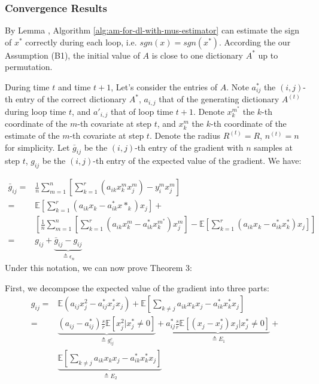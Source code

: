 \subsubsection{Convergence Results}

By Lemma \cite{chatterji2017alternating}, Algorithm  \ref{alg:am-for-dl-with-mus-estimator} can estimate the sign of $x^*$ correctly during each loop, i.e. $sgn(x)=sgn(x^*)$. According the our Assumption (B1), the initial value of $A$ is close to one dictionary $A^*$ up to permutation.

During time $t$ and time $t+1$, Let's consider the entries of $A$. Note $a^*_{ij}$ the $(i,j)$-th entry of the correct dictionary $A^*$, $a_{i,j}$ that of the generating dictionary $A^{(t)}$ during loop time $t$, and $a'_{i,j}$ that of loop time $t+1$. Denote $x^{m^*}_k$ the $k$-th coordinate of the $m$-th covariate at step $t$, and $x^m_k$ the $k$-th coordinate of the estimate of the $m$-th covariate at step $t$. Denote the radius $R^{(t)}=R$, $n^{(t)}=n$ for simplicity. Let $\bar g_{ij}$ be the $(i,j)$-th entry of the gradient with $n$ samples at step $t$, $g_{ij}$ be the $(i,j)$-th entry of the expected value of the gradient. We have:

\begin{equation}
\begin{aligned}
\bar g_{ij}=&\frac1n\sum_{m=1}^n\left[\sum_{k=1}^r(a_{ik}x_k^mx_j^m)-y_i^mx_j^m\right]\\
=&\mathbb E\left[\sum_{k=1}^r\left(a_{ik}x_k-a^*_{ik}x*_k\right)x_j\right]+\\
&\left[\frac1n\sum_{m=1}^n\left[\sum_{k=1}^r(a_{ik}x_k^m-a^*_{ik}x^{m^*}_k)x_j^m\right]-\mathbb E\left[\sum_{k=1}^r\left(a_{ik}x_k-a^*_{ik}x^*_{k}\right)x_j\right]\right]\\
=&g_{ij}+\underbrace{\bar g_{ij}-g_{ij}}_{\triangleq\epsilon_n}
\end{aligned}
\end{equation}
Under this notation, we can now prove Theorem 3:

First, we decompose the expected value of the gradient into three parts:
\begin{equation}
\begin{aligned}
g_{ij}=&\mathbb E \left(a_{ij}x_j^2-a_{ij}^*x_j^*x_j\right)+\mathbb E\left[\sum_{k\neq j}a_{ik}x_kx_j-a^*_{ik}x^*_kx_j\right]\\
=&\underbrace{(a_{ij}-a^*_{ij})\frac s r \mathbb E[x_j^2|x_j^*\neq 0]}_{\triangleq g_{ij}^c}+\underbrace{a^*_{ij}\frac s r\mathbb E [(x_j-x_j^*)x_j|x_j^*\neq0]}_{\triangleq E_1}+\\
&\underbrace{\mathbb E\left[\sum_{k\neq j}a_{ik}x_kx_j-a^*_{ik}x^*_kx_j\right]}_{\triangleq E_2}
\end{aligned}
\end{equation}

